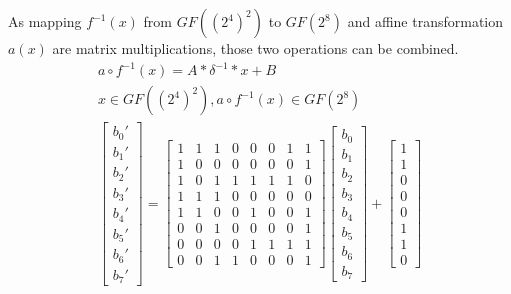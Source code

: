 As mapping $f^{-1}(x)$ from $GF((2^4)^2)$ to $GF(2^8)$ and affine transformation $a(x)$ are matrix multiplications, those two operations can be combined.
\begin{equation}
\begin{gathered}
\label{eq:affine}
a \circ f^{-1}(x) = A * \delta^{-1} * x + B\\
x \in GF((2^4)^2), a \circ f^{-1}(x) \in GF(2^8) \\
\begin{bmatrix}
b_0'\\b_1'\\b_2'\\b_3'\\b_4'\\b_5'\\b_6'\\b_7'
\end{bmatrix}
=
\begin{bmatrix}
    1 & 1 & 1 & 0 & 0 & 0 & 1 & 1 \\
    1 & 0 & 0 & 0 & 0 & 0 & 0 & 1 \\
    1 & 0 & 1 & 1 & 1 & 1 & 1 & 0 \\
    1 & 1 & 1 & 0 & 0 & 0 & 0 & 0 \\
    1 & 1 & 0 & 0 & 1 & 0 & 0 & 1 \\
    0 & 0 & 1 & 0 & 0 & 0 & 0 & 1 \\
    0 & 0 & 0 & 0 & 1 & 1 & 1 & 1 \\
    0 & 0 & 1 & 1 & 0 & 0 & 0 & 1
\end{bmatrix}
\begin{bmatrix}
b_0\\b_1\\b_2\\b_3\\b_4\\b_5\\b_6\\b_7
\end{bmatrix}
+
\begin{bmatrix}
1\\1\\0\\0\\0\\1\\1\\0
\end{bmatrix}
\end{gathered}
\end{equation}

